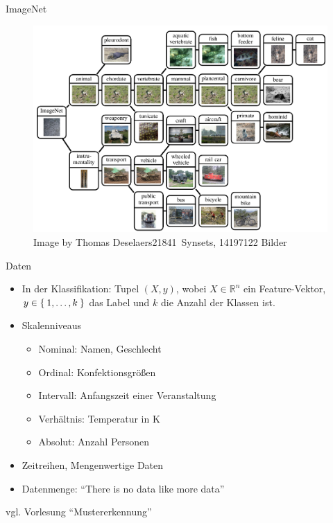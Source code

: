 \begin{frame}{ImageNet}
    \begin{figure}
        \centering
        \includegraphics[width=\textwidth,height=0.7\textheight,keepaspectratio]{../images/prototypes-thomas-deselaers.jpg}
        \caption{Image by Thomas Deselaers\newline\num{21841}~Synsets, \num{14197122} Bilder}
        \label{fig:image-net}
    \end{figure}
\end{frame}

\begin{frame}{Daten}
    \begin{itemize}
        \item In der Klassifikation:
              Tupel $(X, y)$, wobei $X \in \mathbb{R}^n$ ein Feature-Vektor, $y \in \Set{1, \dots, k}$ das Label und $k$ die Anzahl der Klassen ist.
        \item Skalenniveaus
            \begin{itemize}
                \item Nominal: Namen, Geschlecht
                \item Ordinal: Konfektionsgrößen
                \item Intervall: Anfangszeit einer Veranstaltung
                \item Verhältnis: Temperatur in K
                \item Absolut: Anzahl Personen
            \end{itemize}
        \item Zeitreihen, Mengenwertige Daten
        \item Datenmenge: \enquote{There is no data like more data}
    \end{itemize}

    vgl. Vorlesung \enquote{Mustererkennung}
\end{frame}

